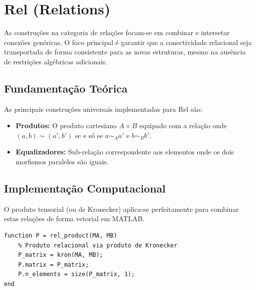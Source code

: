 \section{Rel (Relations)}
As construções na categoria de relações focam-se em combinar e intersetar conexões genéricas. O foco principal é garantir que a conectividade relacional seja transportada de forma consistente para as novas estruturas, mesmo na ausência de restrições algébricas adicionais.

\subsection{Fundamentação Teórica}
As principais construções universais implementadas para Rel são:
\begin{itemize}
    \item \textbf{Produtos:} O produto cartesiano $A \times B$ equipado com a relação onde $(a,b) \sim (a',b')$ se e só se $a \sim_A a'$ e $b \sim_B b'$.
    \item \textbf{Equalizadores:} Sub-relação correspondente aos elementos onde os dois morfismos paralelos são iguais.
\end{itemize}

\subsection{Implementação Computacional}
O produto tensorial (ou de Kronecker) aplica-se perfeitamente para combinar estas relações de forma vetorial em MATLAB.

\begin{lstlisting}[caption={Construção do Produto de Relações}]
function P = rel_product(MA, MB)
    % Produto relacional via produto de Kronecker
    P_matrix = kron(MA, MB);
    P.matrix = P_matrix;
    P.n_elements = size(P_matrix, 1);
end
\end{lstlisting}